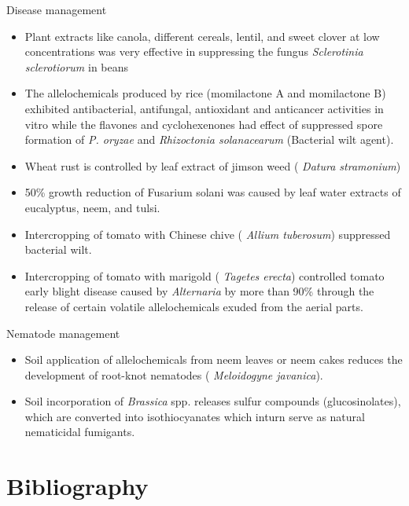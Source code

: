 \documentclass[11pt,dvipsnames,ignorenonframetext,aspectratio=169]{beamer}
\providecommand{\tightlist}{%
  \setlength{\itemsep}{0pt}\setlength{\parskip}{0pt}}
\begin{document}
\begin{frame}{Disease management}
\protect\hypertarget{disease-management}{}
\small

\begin{itemize}
\tightlist
\item
  Plant extracts like canola, different cereals, lentil, and sweet
  clover at low concentrations was very effective in suppressing the
  fungus \emph{Sclerotinia sclerotiorum} in beans
\item
  The allelochemicals produced by rice (momilactone A and momilactone B)
  exhibited antibacterial, antifungal, antioxidant and anticancer
  activities in vitro while the flavones and cyclohexenones had effect
  of suppressed spore formation of \textit{P. oryzae} and
  \textit{Rhizoctonia solanacearum} (Bacterial wilt agent).
\item
  Wheat rust is controlled by leaf extract of jimson weed ( \emph{Datura
  stramonium})
\item
  50\% growth reduction of Fusarium solani was caused by leaf water
  extracts of eucalyptus, neem, and tulsi.
\item
  Intercropping of tomato with Chinese chive ( \emph{Allium tuberosum})
  suppressed bacterial wilt.
\item
  Intercropping of tomato with marigold ( \emph{Tagetes erecta})
  controlled tomato early blight disease caused by \emph{Alternaria} by
  more than 90\% through the release of certain volatile allelochemicals
  exuded from the aerial parts.
\end{itemize}
\end{frame}

\begin{frame}{Nematode management}
\protect\hypertarget{nematode-management}{}
\begin{itemize}
\tightlist
\item
  Soil application of allelochemicals from neem leaves or neem cakes
  reduces the development of root-knot nematodes ( \emph{Meloidogyne
  javanica}).
\item
  Soil incorporation of \emph{Brassica} spp. releases sulfur compounds
  (glucosinolates), which are converted into isothiocyanates which
  inturn serve as natural nematicidal fumigants.
\end{itemize}
\end{frame}

\hypertarget{bibliography}{%
\section{Bibliography}\label{bibliography}}
\end{document}
